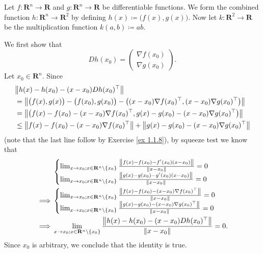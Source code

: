 \begin{example}\label{6.4.2}
    Let \(f : \mathbf{R}^n \to \mathbf{R}\) and \(g : \mathbf{R}^n \to \mathbf{R}\) be differentiable functions.
    We form the combined function \(h : \mathbf{R}^n \to \mathbf{R}^2\) by defining \(h(x) \coloneqq \big(f(x), g(x)\big)\).
    Now let \(k : \mathbf{R}^2 \to \mathbf{R}\) be the multiplication function \(k(a, b) \coloneqq ab\).

    We first show that
    \[
        D h(x_0) = \begin{pmatrix}
            \nabla f(x_0) \\
            \nabla g(x_0)
        \end{pmatrix}.
    \]
    Let \(x_0 \in \mathbf{R}^n\).
    Since
    \begin{align*}
         & \norm*{h(x) - h(x_0) - (x - x_0) D h(x_0)^\top}                                                                                  \\
         & = \norm*{\big(f(x), g(x)\big) - \big(f(x_0), g(x_0)\big) - \big((x - x_0) \nabla f(x_0)^\top, (x - x_0) \nabla g(x_0)^\top\big)} \\
         & = \norm*{\big(f(x) - f(x_0) - (x - x_0) \nabla f(x_0)^\top, g(x) - g(x_0) - (x - x_0) \nabla g(x_0)^\top\big)}                   \\
         & \leq \norm*{f(x) - f(x_0) - (x - x_0) \nabla f(x_0)^\top} + \norm*{g(x) - g(x_0) - (x - x_0) \nabla g(x_0)^\top}
    \end{align*}
    (note that the last line follow by Exercise \ref{ex 1.1.8}),
    by squeeze test we know that
    \begin{align*}
                 & \begin{cases}
                       \lim_{x \to x_0 ; x \in \mathbf{R}^n \setminus \{x_0\}} \frac{\norm*{f(x) - f(x_0) - f'(x_0)(x - x_0)}}{\norm*{x - x_0}} = 0 \\
                       \lim_{x \to x_0 ; x \in \mathbf{R}^n \setminus \{x_0\}} \frac{\norm*{g(x) - g(x_0) - g'(x_0)(x - x_0)}}{\norm*{x - x_0}} = 0
                   \end{cases}        \\
        \implies & \begin{cases}
                       \lim_{x \to x_0 ; x \in \mathbf{R}^n \setminus \{x_0\}} \frac{\norm*{f(x) - f(x_0) - (x - x_0) \nabla f(x_0)^\top}}{\norm*{x - x_0}} = 0 \\
                       \lim_{x \to x_0 ; x \in \mathbf{R}^n \setminus \{x_0\}} \frac{\norm*{g(x) - g(x_0) - (x - x_0) \nabla g(x_0)^\top}}{\norm*{x - x_0}} = 0
                   \end{cases}        \\
        \implies & \lim_{x \to x_0 ; x \in \mathbf{R}^n \setminus \{x_0\}} \frac{\norm*{h(x) - h(x_0) - (x - x_0) D h(x_0)^\top}}{\norm*{x - x_0}} = 0.
    \end{align*}
    Since \(x_0\) is arbitrary, we conclude that the identity is true.


\end{example}
